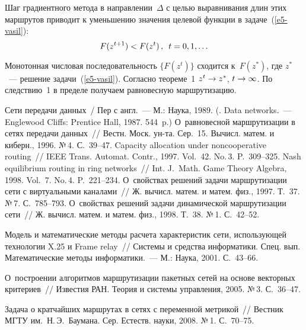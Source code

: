 \begin{multicols}{2}
  Шаг градиентного метода в направлении~$\Delta$ с целью выравнивания длин 
этих маршрутов приводит к уменьшению значения целевой функции в 
задаче~(\ref{e5-vasil}):
  $$
  F(z^{t+1})< F(z^t)\,,\enskip t=0,1,\ldots
  $$
  
  Монотонная числовая последовательность $\{ F(z^t)\}$ сходится к~$F(z^*)$, где 
$z^*$~--- решение задачи~(\ref{e5-vasil}). Согласно теореме~1 $z^t\hm\to z^*$, 
$t\hm\to\infty$. По следствию~1 в пределе получаем равновесную маршрутизацию.
  
{\small\frenchspacing
{%
\begin{thebibliography}{99}
 Сети передачи данных~/ 
Пер с англ.~--- М.: Наука, 1989.
(. 
{Data networks}.~--- Englewood Cliffs: Prentice Hall, 1987. 544~p.)
 О~равновесной маршрутизации в сетях 
передачи данных~// Вестн. Моск. ун-та. Сер.~15. Вычисл. матем. и киберн., 1996. №\,4. 
С.~39--47.
 Capacity allocation under noncooperative 
routing~// IEEE Trans. Automat. Contr., 1997. Vol.~42. No.\,3. P.~309--325.
 Nash equilibrium routing in ring networks~// Int. J.~Math. Game 
Theory  Algebra, 1998. Vol.~7. No.\,4. P.~221--234.
 О~свойствах решений задачи маршрутизации сети с 
виртуальными каналами~// Ж. вычисл. матем. и матем. физ., 1997. Т.~37. №\,7. 
С.~785--793.
 О~свойствах решений задачи динамической маршрутизации 
сети~// Ж. вычисл. матем. и матем. физ., 1998. Т.~38. №\,1. С.~42--52.

 Модель и математические методы расчета 
характеристик сети, использующей технологии X.25 и Frame relay~// Системы и 
средства информатики. Спец. вып. Математические методы информатики.~--- М.: 
Наука, 2001. С.~43--66.

 О~построении алгоритмов маршрутизации 
пакетных сетей на основе векторных критериев~// Известия РАН. Теория и системы 
управления, 2005. №\,3. С.~36--47.

 Задача о кратчайших маршрутах в сетях с переменной 
метрикой~// Вестник МГТУ им.\ Н.\,Э.~Баумана. Сер. Естеств. науки, 2008. №\,1. 
С.~70--75.


\end{thebibliography}}}
\end{multicols}
